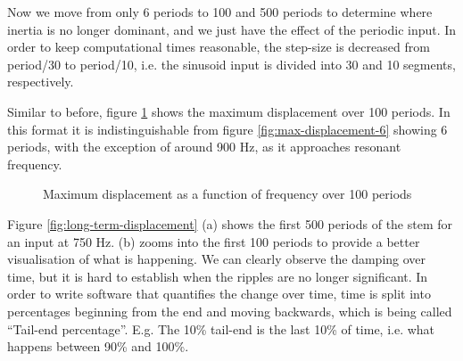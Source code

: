 Now we move from only 6 periods to 100 and 500 periods to determine where inertia is no longer dominant, and we just have the effect of the periodic input.
In order to keep computational times reasonable, the step-size is decreased from period/30 to period/10, i.e. the sinusoid input is divided into 30 and 10 segments, respectively.

Similar to before, figure \ref{fig:max-displacement-100} shows the maximum displacement over 100 periods.
In this format it is indistinguishable from figure \ref{fig:max-displacement-6} showing 6 periods, with the exception of around 900 Hz, as it approaches resonant frequency.
\begin{figure}[h]\centering

\caption{Maximum displacement as a function of frequency over 100 periods}
\label{fig:max-displacement-100}
\end{figure}

Figure \ref{fig:long-term-displacement} (a) shows the first 500 periods of the stem for an input at 750 Hz.
(b) zooms into the first 100 periods to provide a better visualisation of what is happening.
We can clearly observe the damping over time, but it is hard to establish when the ripples are no longer significant.
In order to write software that quantifies the change over time, time is split into percentages beginning from the end and moving backwards, which is being called ``Tail-end percentage''.
E.g. The 10\% tail-end is the last 10\% of time, i.e. what happens between 90\% and 100\%.


